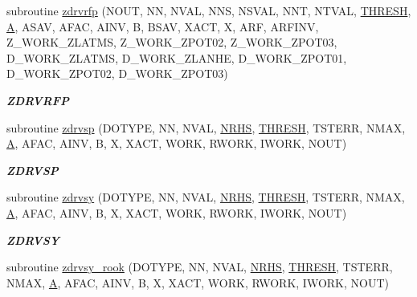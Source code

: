 \begin{DoxyCompactItemize}
subroutine \hyperlink{group__complex16__lin_ga56e04460a51baee5bf4cd2ae7588bc2c}{zdrvrfp} (N\+O\+U\+T, N\+N, N\+V\+A\+L, N\+N\+S, N\+S\+V\+A\+L, N\+N\+T, N\+T\+V\+A\+L, \hyperlink{zlaqgs_8c_a0656018abfc9fa2821827415f5d5ea57}{T\+H\+R\+E\+S\+H}, \hyperlink{classA}{A}, A\+S\+A\+V, A\+F\+A\+C, A\+I\+N\+V, B, B\+S\+A\+V, X\+A\+C\+T, X, A\+R\+F, A\+R\+F\+I\+N\+V, Z\+\_\+\+W\+O\+R\+K\+\_\+\+Z\+L\+A\+T\+M\+S, Z\+\_\+\+W\+O\+R\+K\+\_\+\+Z\+P\+O\+T02, Z\+\_\+\+W\+O\+R\+K\+\_\+\+Z\+P\+O\+T03, D\+\_\+\+W\+O\+R\+K\+\_\+\+Z\+L\+A\+T\+M\+S, D\+\_\+\+W\+O\+R\+K\+\_\+\+Z\+L\+A\+N\+H\+E, D\+\_\+\+W\+O\+R\+K\+\_\+\+Z\+P\+O\+T01, D\+\_\+\+W\+O\+R\+K\+\_\+\+Z\+P\+O\+T02, D\+\_\+\+W\+O\+R\+K\+\_\+\+Z\+P\+O\+T03)
\begin{DoxyCompactList}\small\item\em {\bfseries Z\+D\+R\+V\+R\+F\+P} \end{DoxyCompactList}\item 
subroutine \hyperlink{group__complex16__lin_ga48582705f728291055c10605e86b6b00}{zdrvsp} (D\+O\+T\+Y\+P\+E, N\+N, N\+V\+A\+L, \hyperlink{example__user_8c_aa0138da002ce2a90360df2f521eb3198}{N\+R\+H\+S}, \hyperlink{zlaqgs_8c_a0656018abfc9fa2821827415f5d5ea57}{T\+H\+R\+E\+S\+H}, T\+S\+T\+E\+R\+R, N\+M\+A\+X, \hyperlink{classA}{A}, A\+F\+A\+C, A\+I\+N\+V, B, X, X\+A\+C\+T, W\+O\+R\+K, R\+W\+O\+R\+K, I\+W\+O\+R\+K, N\+O\+U\+T)
\begin{DoxyCompactList}\small\item\em {\bfseries Z\+D\+R\+V\+S\+P} \end{DoxyCompactList}\item 
subroutine \hyperlink{group__complex16__lin_ga18d7472059556852d8160b70d49a885e}{zdrvsy} (D\+O\+T\+Y\+P\+E, N\+N, N\+V\+A\+L, \hyperlink{example__user_8c_aa0138da002ce2a90360df2f521eb3198}{N\+R\+H\+S}, \hyperlink{zlaqgs_8c_a0656018abfc9fa2821827415f5d5ea57}{T\+H\+R\+E\+S\+H}, T\+S\+T\+E\+R\+R, N\+M\+A\+X, \hyperlink{classA}{A}, A\+F\+A\+C, A\+I\+N\+V, B, X, X\+A\+C\+T, W\+O\+R\+K, R\+W\+O\+R\+K, I\+W\+O\+R\+K, N\+O\+U\+T)
\begin{DoxyCompactList}\small\item\em {\bfseries Z\+D\+R\+V\+S\+Y} \end{DoxyCompactList}\item 
subroutine \hyperlink{group__complex16__lin_gabdb050f45b6ff542cc09b05e186289eb}{zdrvsy\+\_\+rook} (D\+O\+T\+Y\+P\+E, N\+N, N\+V\+A\+L, \hyperlink{example__user_8c_aa0138da002ce2a90360df2f521eb3198}{N\+R\+H\+S}, \hyperlink{zlaqgs_8c_a0656018abfc9fa2821827415f5d5ea57}{T\+H\+R\+E\+S\+H}, T\+S\+T\+E\+R\+R, N\+M\+A\+X, \hyperlink{classA}{A}, A\+F\+A\+C, A\+I\+N\+V, B, X, X\+A\+C\+T, W\+O\+R\+K, R\+W\+O\+R\+K, I\+W\+O\+R\+K, N\+O\+U\+T)

\end{DoxyCompactItemize}
